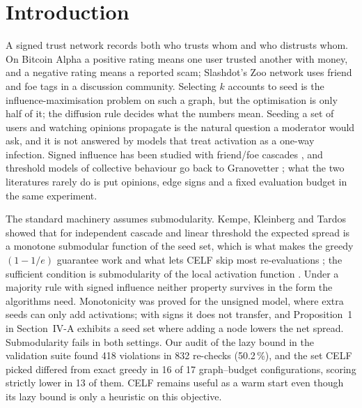 \documentclass[journal,letterpaper,10pt]{IEEEtran}
\begin{document}
\section{Introduction}

A signed trust network records both who trusts whom and who distrusts whom. On Bitcoin Alpha a positive rating means one user trusted another with money, and a negative rating means a reported scam; Slashdot's Zoo network uses friend and foe tags in a discussion community. Selecting $k$ accounts to seed is the influence-maximisation problem on such a graph, but the optimisation is only half of it; the diffusion rule decides what the numbers mean. Seeding a set of users and watching opinions propagate is the natural question a moderator would ask, and it is not answered by models that treat activation as a one-way infection. Signed influence has been studied with friend/foe cascades \cite{li2013}, and threshold models of collective behaviour go back to Granovetter \cite{granovetter1978}; what the two literatures rarely do is put opinions, edge signs and a fixed evaluation budget in the same experiment.

The standard machinery assumes submodularity. Kempe, Kleinberg and Tardos showed that for independent cascade and linear threshold the expected spread is a monotone submodular function of the seed set, which is what makes the greedy $(1-1/e)$ guarantee work \cite{kempe2003} and what lets CELF skip most re-evaluations \cite{leskovec2007}; the sufficient condition is submodularity of the local activation function \cite{mossel2007}. Under a majority rule with signed influence neither property survives in the form the algorithms need. Monotonicity was proved for the unsigned model, where extra seeds can only add activations; with signs it does not transfer, and Proposition~1 in Section~IV-A exhibits a seed set where adding a node lowers the net spread. Submodularity fails in both settings. Our audit of the lazy bound in the validation suite found 418 violations in 832 re-checks (50.2\,\%), and the set CELF picked differed from exact greedy in 16 of 17 graph--budget configurations, scoring strictly lower in 13 of them. CELF remains useful as a warm start even though its lazy bound is only a heuristic on this objective.
\end{document}
